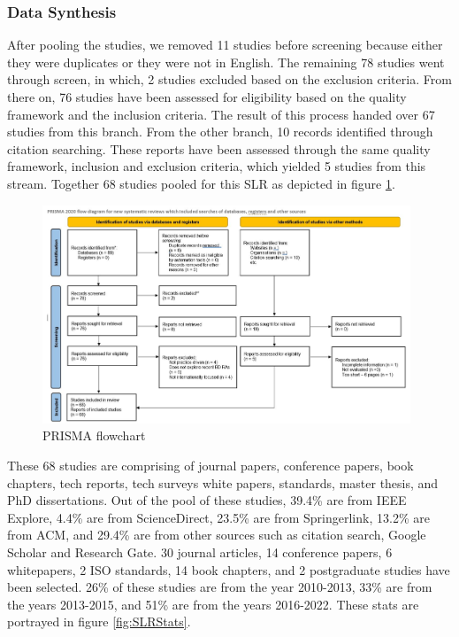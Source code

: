 \documentclass[review]{elsarticle}
\begin{document}
\subsubsection{Data Synthesis}

After pooling the studies, we removed 11 studies before screening because either they were duplicates or they were not in English. The remaining 78 studies went through screen, in which, 2 studies excluded based on the exclusion criteria. From there on, 76 studies have been assessed for eligibility based on the quality framework and the inclusion criteria. The result of this process handed over 67 studies from this branch. From the other branch, 10 records identified through citation searching. These reports have been assessed through the same quality framework, inclusion and exclusion criteria, which yielded 5 studies from this stream. Together 68 studies pooled for this SLR as depicted in figure \ref{fig:PRISMA}.

\begin{figure}[h!]
    \centering
    \includegraphics[width=11cm]{PRISMA.JPG}
    \caption{PRISMA flowchart}
    \label{fig:PRISMA}
\end{figure}


These 68 studies are comprising of journal papers, conference papers, book chapters, tech reports, tech surveys white papers, standards, master thesis, and PhD dissertations. Out of the pool of these studies, 39.4\% are from IEEE Explore, 4.4\% are from ScienceDirect, 23.5\% are from Springerlink, 13.2\% are from ACM, and 29.4\% are from other sources such as citation search, Google Scholar and Research Gate. 30 journal articles, 14 conference papers, 6 whitepapers, 2 ISO standards, 14 book chapters, and 2 postgraduate studies have been selected. 26\% of these studies are from the year 2010-2013, 33\% are from the years 2013-2015, and 51\% are from the years 2016-2022. These stats are portrayed in figure \ref{fig:SLRStats}. 
\end{document}
